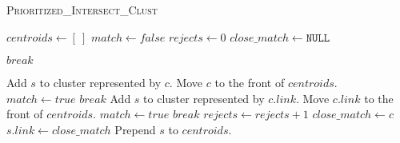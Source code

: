 \begin{algorithm}
  \caption{\textsc{Prioritized\_Intersect\_Clust}}
  \label{alg:intersect_clust}
  \begin{algorithmic}[1]
    \Statex
      \State $centroids \gets [~]$ 
        \State $match \gets false$
        \State $rejects \gets 0$
        \State $close\_match \gets \mathtt{NULL}$

            \State $break$
          \EndIf

          \State{}
              \State Add $s$ to cluster represented by $c$.
              \State Move $c$ to the front of $centroids$.
              \State $match \gets true$
              \State $break$
            \EndIf
            \State
              \State Add $s$ to cluster represented by $c.link$.
              \State Move $c.link$ to the front of $centroids$.
              \State $match \gets true$
              \State $break$
            \EndIf
            \State $rejects \gets rejects + 1$
            \State $close\_match \gets c$
          \EndIf
        \EndFor
        \State
          
            \State $s.link \gets close\_match$
          \EndIf
          \State Prepend $s$ to $centroids$.
        \EndIf
      \EndFor
    \EndFunction
  \end{algorithmic}
\end{algorithm}
